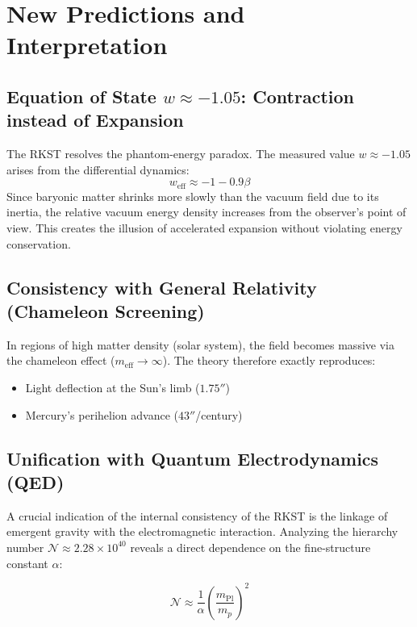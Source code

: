 \documentclass[11pt,a4paper]{article}
\begin{document}
\section{New Predictions and Interpretation}
\label{sec:predictions}

\subsection{Equation of State $w \approx -1.05$: Contraction instead of Expansion}
The RKST resolves the phantom-energy paradox. The measured value $w \approx -1.05$ arises from the differential dynamics:
\begin{equation}
w_{\text{eff}} \approx -1 - 0.9\beta
\end{equation}
Since baryonic matter shrinks more slowly than the vacuum field due to its inertia, the relative vacuum energy density increases from the observer’s point of view. This creates the illusion of accelerated expansion without violating energy conservation.

\subsection{Consistency with General Relativity (Chameleon Screening)}
In regions of high matter density (solar system), the field becomes massive via the chameleon effect \cite{chameleon} ($m_{\text{eff}} \to \infty$). The theory therefore exactly reproduces:
\begin{itemize}
    \item Light deflection at the Sun’s limb ($1.75''$)
    \item Mercury’s perihelion advance ($43''$/century)
\end{itemize}

\subsection{Unification with Quantum Electrodynamics (QED)}
\label{subsec:qed_unification}

A crucial indication of the internal consistency of the RKST is the linkage of emergent gravity with the electromagnetic interaction. Analyzing the hierarchy number $\mathcal{N} \approx 2.28 \times 10^{40}$ reveals a direct dependence on the fine-structure constant $\alpha$:

\begin{equation}
\mathcal{N} \approx \frac{1}{\alpha} \left(\frac{m_{\text{Pl}}}{m_p}\right)^2
\label{eq:hierarchy_qed}
\end{equation}
\end{document}
